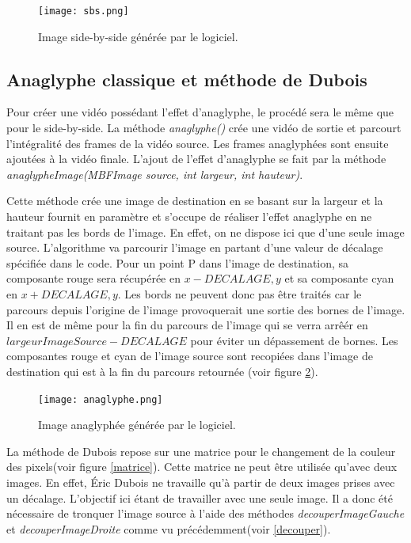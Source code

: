 \documentclass[10pt,a4paper]{article}
\begin{document}



\begin{figure}[!h]
\center
\texttt{[image: sbs.png]}
\caption{Image side-by-side générée par le logiciel.}
\label{sbslog}
\end{figure}
\newpage
\subsection{Anaglyphe classique et méthode de Dubois}

Pour créer une vidéo possédant l'effet d'anaglyphe, le procédé sera le même que pour le side-by-side. La méthode \textit{anaglyphe()} crée une vidéo de sortie et parcourt l'intégralité des frames de la vidéo source. Les frames anaglyphées sont ensuite ajoutées à la vidéo finale. L'ajout de l'effet d'anaglyphe se fait par la méthode \textit{anaglypheImage(MBFImage source, int largeur, int hauteur)}. 

Cette méthode crée une image de destination en se basant sur la largeur et la hauteur fournit en paramètre et s'occupe de réaliser l'effet anaglyphe en ne traitant pas les bords de l'image. En effet, on ne dispose ici que d'une seule image source. L'algorithme va parcourir l'image en partant d'une valeur de décalage spécifiée dans le code. Pour un point P dans l'image de destination, sa composante rouge sera récupérée en $x - DECALAGE, y$ et sa composante cyan en $x + DECALAGE, y$. Les bords ne peuvent donc pas être traités car le parcours depuis l'origine de l'image provoquerait une sortie des bornes de l'image. Il en est de même pour la fin du parcours de l'image qui se verra arrêér en $largeurImageSource - DECALAGE$ pour éviter un dépassement de bornes. Les composantes rouge et cyan de l'image source sont recopiées dans l'image de destination qui est à la fin du parcours retournée (voir figure \ref{analog}).\\ 

\begin{figure}[!h]
\center
\texttt{[image: anaglyphe.png]}
\caption{Image anaglyphée générée par le logiciel.}
\label{analog}
\end{figure}  
\newpage
La méthode de Dubois repose sur une matrice pour le changement de la couleur des pixels(voir figure \ref{matrice}). Cette matrice ne peut être utilisée qu'avec deux images. En effet, Éric Dubois ne travaille qu'à partir de deux images prises avec un décalage. L'objectif ici étant de travailler avec une seule image. Il a donc été nécessaire de tronquer l'image source à l'aide  des méthodes \textit{decouperImageGauche} et \textit{decouperImageDroite} comme vu précédemment(voir \ref{decouper}). 
\end{document}
